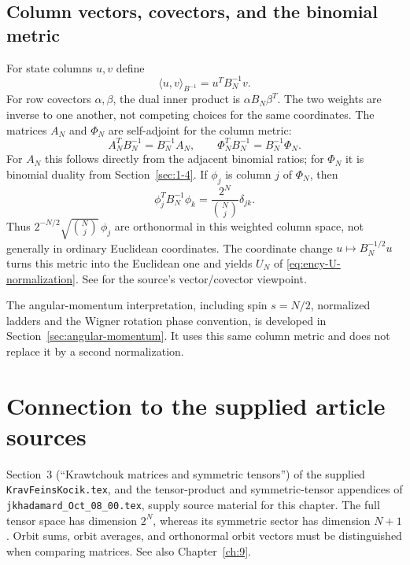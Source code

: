\subsection{Column vectors, covectors, and the binomial metric}
\label{sec:binomial-dual-metrics}
For state columns $u,v$ define
\[
\langle u,v\rangle_{B^{-1}}=u^TB_N^{-1}v.
\]
For row covectors $\alpha,\beta$, the dual inner product is
$\alpha B_N\beta^T$. The two weights are inverse to one another,
not competing choices for the same coordinates.
The matrices $A_N$ and $\Phi_N$ are self-adjoint for the column metric:
\[
A_N^TB_N^{-1}=B_N^{-1}A_N,\qquad
\Phi_N^TB_N^{-1}=B_N^{-1}\Phi_N.
\]
For $A_N$ this follows directly from the adjacent binomial ratios; for
$\Phi_N$ it is binomial duality from Section~\ref{sec:1-4}.
If $\phi_j$ is column $j$ of $\Phi_N$, then
\[
\phi_j^TB_N^{-1}\phi_k=\frac{2^N}{\binom Nj}\delta_{jk}.
\]
Thus $2^{-N/2}\sqrt{\binom Nj}\,\phi_j$ are orthonormal in this
weighted column space, not generally in ordinary Euclidean coordinates.
The coordinate change $u\mapsto B_N^{-1/2}u$ turns this metric into
the Euclidean one and yields $U_N$ of \eqref{eq:ency-U-normalization}.
See \cite[Appendix~A]{KocikFeynman} for the source's vector/covector viewpoint.

The angular-momentum interpretation, including spin $s=N/2$, normalized ladders and the Wigner rotation phase convention, is developed in Section~\ref{sec:angular-momentum}. It uses this same column metric and does not replace it by a second normalization.

\section*{Connection to the supplied article sources}
Section~3 (``Krawtchouk matrices and symmetric tensors'') of the supplied
\texttt{KravFeinsKocik.tex}, and the tensor-product and symmetric-tensor
appendices of \texttt{jkhadamard\_Oct\_08\_00.tex}, supply source material
for this chapter. The full tensor space has dimension $2^N$, whereas its
symmetric sector has dimension $N+1$. Orbit sums, orbit averages, and
orthonormal orbit vectors must be distinguished when comparing matrices.
See also Chapter~\ref{ch:9}.
